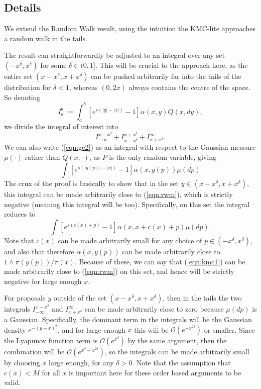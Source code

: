 \documentclass{article}
\begin{document}
\subsection{Details}

We extend the Random Walk result, using the intuition the KMC-lite approaches a random walk in the tails.

The result can straightforwardly be adjusted to an integral over any set $(-x^\delta,x^{\delta})$ for some $\delta \in (0,1]$.  This will be crucial to the approach here, as the entire set $(x - x^\delta,x + x^\delta)$ can be pushed arbitrarily far into the tails of the distribution for $\delta < 1$, whereas $(0,2x)$ always contains the centre of the space.  So denoting
\[
I_a^b := \int_a^b \left[ e^{s(|y| - |x|)} - 1 \right]\alpha(x,y)Q(x,dy),
\]
we divide the integral of interest into
\[
I_{-\infty}^{x - x^\delta} + I_{x - x^\delta}^{x + x^\delta} + I_{x+x^\delta}^\infty.
\]
We can also write (\ref{eqn:ge2}) as an integral with respect to the Gaussian measure $\mu(\cdot)$ rather than $Q(x,\cdot)$, as $P$ is the only random variable, giving
\[
\int \left[ e^{s(|y(p)| - |x|)} - 1 \right] \alpha(x,y(p)) \mu(dp)
\]
The crux of the proof is basically to show that in the set $y \in (x - x^\delta,x+ x^{\delta})$, this integral can be made arbitrarily close to (\ref{eqn:rwm}), which is strictly negative (meaning this integral will be too).  Specifically, on this set the integral reduces to
\begin{equation} \label{eqn:kmc1}
\int \left[ e^{s(c(x) + p)} - 1 \right] \alpha(x,x + c(x) + p) \mu(dp).
\end{equation}
Note that $c(x)$ can be made arbitrarily small for any choice of $p \in (-x^\delta,x^\delta)$, and also that therefore $\alpha(x,y(p))$ can be made arbitrarily close to $1 \wedge \pi(y(p))/\pi(x)$.  Because of these, we can say that (\ref{eqn:kmc1}) can be made arbitrarily close to (\ref{eqn:rwm}) on this set, and hence will be strictly negative for large enough $x$.

For proposals $y$ outside of the set $(x - x^\delta,x + x^\delta)$, then in the tails the two integrals $I_{-\infty}^{x - x^\delta}$ and $I_{x + x^\delta}^\infty$ can be made arbitrarily close to zero because $\mu(dp)$ is a Gaussian.  Specifically, the dominant term in the integrals will be the Gaussian density $e^{-(y-x)^2}$, and for large enough $x$ this will be $\mathcal{O}(e^{-x^{2\delta}})$ or smaller.  Since the Lyapunov function term is $\mathcal{O}(e^{x^\delta})$ by the same argument, then the combination will be $\mathcal{O}(e^{x^\delta - x^{2\delta}})$, so the integrals can be made arbitrarily small by choosing $x$ large enough, for any $\delta > 0$.  Note that the assumption that $c(x) < M$ for all $x$ is important here for these order based arguments to be valid.
\end{document}
